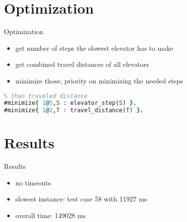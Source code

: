 \documentclass{beamer}
\begin{document}
\section{Optimization}

\begin{frame}[fragile]{Optimization}
  \begin{itemize}
    \item get number of steps the slowest elevator has to make
    \item get combined travel distances of all elevators
    \item minimize those, priority on minimizing the needed steps
  \end{itemize}

\begin{lstlisting}[language=Prolog]
% minimizing steps is more important
% than traveled distance
#minimize{ 1@5,S : elevator_step(S) }.
#minimize{ 1@2,T : travel_distance(T) }.
\end{lstlisting}
\end{frame}





  \section{Results}

  \begin{frame}{Results}
  \begin{itemize}
  	\item no timeouts
  	\item slowest instance: test case 58 with 11927 ms
  	\item overall time: 149028 ms
  \end{itemize}

  \end{frame}


\end{document}
